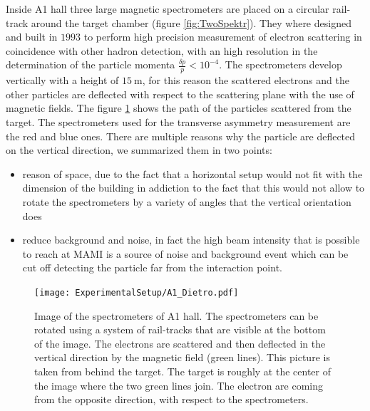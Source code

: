 Inside A1 hall three large magnetic spectrometers are placed on a circular rail-track around the target chamber (figure \ref{fig:TwoSpektr}). They where designed and built in $1993$ to perform high precision measurement of electron scattering in coincidence with other hadron detection, with an high resolution in the determination of the particle momenta $\frac{\delta p}{p} < 10^{-4}$. The spectrometers develop vertically with a height of $\SI{15}{\meter}$, for this reason the scattered electrons and the other particles are deflected with respect to the scattering plane with the use of magnetic fields. The figure \ref{fig:TwoDetectors} shows the path of the particles scattered from the target. The spectrometers used for the transverse asymmetry measurement are the red and blue ones. There are multiple reasons why the particle are deflected on the vertical direction, we summarized them in two points: 

\begin{itemize}
\item reason of space, due to the fact that a horizontal setup would not fit with the dimension of the building in addiction to the fact that this would not allow to rotate the spectrometers by a variety of angles that the vertical orientation does
\item reduce background and noise, in fact the high beam intensity that is possible to reach at MAMI is a source of noise and background event which can be cut off detecting the particle far from the interaction point.
\end{itemize}    

\begin{figure}
\centering
\caption{Image of the spectrometers of A1 hall. The spectrometers can be rotated using a system of rail-tracks that are visible at the bottom of the image. The electrons are scattered and then deflected in the vertical direction by the magnetic field (green lines). This picture is taken from behind the target. The target is roughly at the center of the image where the two green lines join. The electron are coming from the opposite direction, with respect to the spectrometers.}\label{fig:TwoDetectors}
\texttt{[image: ExperimentalSetup/A1\_Dietro.pdf]}
\end{figure}
  
